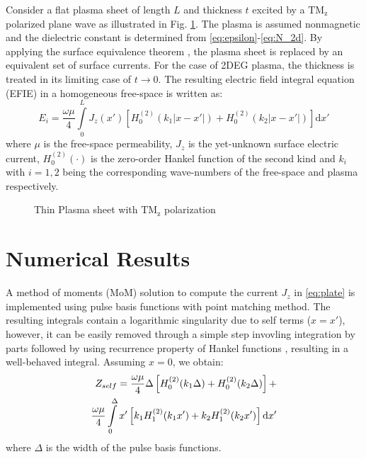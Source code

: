\documentclass[conference, 10pt]{IEEEtran}
\renewcommand{\O}{\omega}  %
\renewcommand{\u}{\mu}  %
\renewcommand{\^}{\hat}  %
\begin{document}
Consider a flat plasma sheet of length $L$ and thickness $t$ excited by a $\mathrm{TM_z}$ polarized plane wave as illustrated in Fig. \ref{fig:plate}. The plasma is assumed nonmagnetic and the dielectric constant is determined from \eqref{eq:epsilon}-\eqref{eq:N_2d}. By applying the surface equivalence theorem \cite[p. 328-333]{balanis2012advanced}, the plasma sheet is replaced by an equivalent set of surface currents. For the case of 2DEG plasma, the thickness is treated in its limiting case of $t \to 0$. The resulting electric field integral equation (EFIE) in a homogeneous free-space is written as:
%
\begin{equation}
  E_i = \frac{\O \u}{4} \int \limits_{0}^{L} J_z(x') \left[ H_0^{(2)}(k_1 |x - x'|) + H_0^{(2)}(k_2 |x - x'|)\right] \mathrm{d}x'
  \label{eq:plate}
\end{equation}
%
where $\mu$ is the free-space permeability, $J_z$ is the yet-unknown surface electric current, $H_0^{(2)}(\cdot)$ is the zero-order Hankel function of the second kind and $k_i$ with $i = 1,2$ being the corresponding wave-numbers of the free-space and plasma respectively.
%
\begin{figure}[h]
  \normalsize
  \centering
  
  \caption{Thin Plasma sheet with $\mathrm{TM_z}$ polarization}
  \label{fig:plate}
\end{figure}
%
\section{Numerical Results}
%
A method of moments (MoM) solution to compute the current $J_z$ in \eqref{eq:plate} is implemented using pulse basis functions with point matching method. The resulting integrals contain a logarithmic singularity due to self terms ($ x = x'$), however, it can be easily removed through a simple step invovling integration by parts followed by using recurrence property of Hankel functions \cite[p. 361]{amari1995efficient,abramowitz1968handbook}, resulting in a well-behaved integral. Assuming $x = 0$, we obtain:
%
\begin{align}
  Z_{self} = \frac{\O \u}{4} \Delta \left[H_0^{(2)}(k_1 \Delta) +  H_0^{(2)}(k_2 \Delta)\right] + \notag\\
  \frac{\O \u}{4} \int \limits_{0}^{\Delta} x'\left[ k_1 H_1^{(2)}(k_1 x')  + k_2 H_1^{(2)}(k_2 x')\right] \mathrm{d}x'
  \label{eq:self}
\end{align}
%
where $\Delta$ is the width of the pulse basis functions.
%
\end{document}

